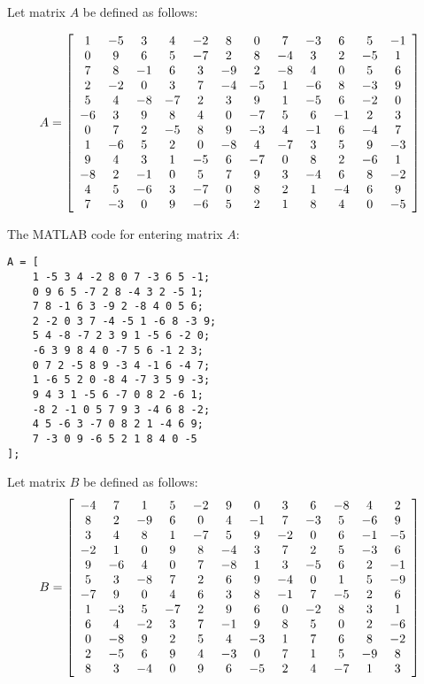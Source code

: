 \documentclass{ximera}
\author{Zack Reed}
\begin{document}
\begin{exercise}
 
  Let matrix $A$ be defined as follows:

  \begin{equation*}
  A = \startmat{cccccccccccc}
  1 & -5 & 3 & 4 & -2 & 8 & 0 & 7 & -3 & 6 & 5 & -1 \\
  0 & 9 & 6 & 5 & -7 & 2 & 8 & -4 & 3 & 2 & -5 & 1 \\
  7 & 8 & -1 & 6 & 3 & -9 & 2 & -8 & 4 & 0 & 5 & 6 \\
  2 & -2 & 0 & 3 & 7 & -4 & -5 & 1 & -6 & 8 & -3 & 9 \\
  5 & 4 & -8 & -7 & 2 & 3 & 9 & 1 & -5 & 6 & -2 & 0 \\
  -6 & 3 & 9 & 8 & 4 & 0 & -7 & 5 & 6 & -1 & 2 & 3 \\
  0 & 7 & 2 & -5 & 8 & 9 & -3 & 4 & -1 & 6 & -4 & 7 \\
  1 & -6 & 5 & 2 & 0 & -8 & 4 & -7 & 3 & 5 & 9 & -3 \\
  9 & 4 & 3 & 1 & -5 & 6 & -7 & 0 & 8 & 2 & -6 & 1 \\
  -8 & 2 & -1 & 0 & 5 & 7 & 9 & 3 & -4 & 6 & 8 & -2 \\
  4 & 5 & -6 & 3 & -7 & 0 & 8 & 2 & 1 & -4 & 6 & 9 \\
  7 & -3 & 0 & 9 & -6 & 5 & 2 & 1 & 8 & 4 & 0 & -5 \\
  \stopmat
  \end{equation*}


The MATLAB code for entering matrix $A$:
\begin{verbatim}
A = [  
    1 -5 3 4 -2 8 0 7 -3 6 5 -1;  
    0 9 6 5 -7 2 8 -4 3 2 -5 1;  
    7 8 -1 6 3 -9 2 -8 4 0 5 6;  
    2 -2 0 3 7 -4 -5 1 -6 8 -3 9;  
    5 4 -8 -7 2 3 9 1 -5 6 -2 0;  
    -6 3 9 8 4 0 -7 5 6 -1 2 3;  
    0 7 2 -5 8 9 -3 4 -1 6 -4 7;  
    1 -6 5 2 0 -8 4 -7 3 5 9 -3;  
    9 4 3 1 -5 6 -7 0 8 2 -6 1;  
    -8 2 -1 0 5 7 9 3 -4 6 8 -2;  
    4 5 -6 3 -7 0 8 2 1 -4 6 9;  
    7 -3 0 9 -6 5 2 1 8 4 0 -5  
];
\end{verbatim}

Let matrix $B$ be defined as follows:
\[
B = \startmat{cccccccccccc}
-4 & 7 & 1 & 5 & -2 & 9 & 0 & 3 & 6 & -8 & 4 & 2 \\
8 & 2 & -9 & 6 & 0 & 4 & -1 & 7 & -3 & 5 & -6 & 9 \\
3 & 4 & 8 & 1 & -7 & 5 & 9 & -2 & 0 & 6 & -1 & -5 \\
-2 & 1 & 0 & 9 & 8 & -4 & 3 & 7 & 2 & 5 & -3 & 6 \\
9 & -6 & 4 & 0 & 7 & -8 & 1 & 3 & -5 & 6 & 2 & -1 \\
5 & 3 & -8 & 7 & 2 & 6 & 9 & -4 & 0 & 1 & 5 & -9 \\
-7 & 9 & 0 & 4 & 6 & 3 & 8 & -1 & 7 & -5 & 2 & 6 \\
1 & -3 & 5 & -7 & 2 & 9 & 6 & 0 & -2 & 8 & 3 & 1 \\
6 & 4 & -2 & 3 & 7 & -1 & 9 & 8 & 5 & 0 & 2 & -6 \\
0 & -8 & 9 & 2 & 5 & 4 & -3 & 1 & 7 & 6 & 8 & -2 \\
2 & -5 & 6 & 9 & 4 & -3 & 0 & 7 & 1 & 5 & -9 & 8 \\
8 & 3 & -4 & 0 & 9 & 6 & -5 & 2 & 4 & -7 & 1 & 3 \\
\stopmat
\]



\end{exercise}
\end{document}
